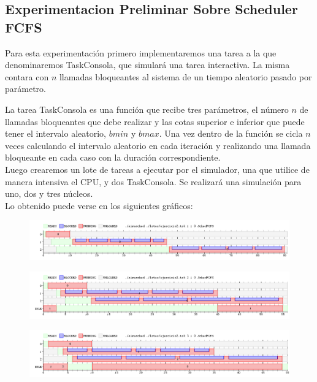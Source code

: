 \subsection{Experimentacion Preliminar Sobre Scheduler FCFS}

Para esta experimentación primero implementaremos una tarea a la que denominaremos TaskConsola, que simulará una tarea interactiva. La misma contara con $n$ llamadas bloqueantes al sistema de un tiempo aleatorio pasado por parámetro.

La tarea TaskConsola es una función que recibe tres parámetros, el número $n$ de llamadas bloqueantes que debe realizar y las cotas superior e inferior que puede tener el intervalo aleatorio, $bmin$ y $bmax$. Una vez dentro de la función se cicla $n$ veces calculando el intervalo aleatorio en cada iteración y realizando una llamada bloqueante en cada caso con la duración correspondiente.
\\
Luego crearemos un lote de tareas a ejecutar por el simulador, una que utilice de manera intensiva el CPU, y dos TaskConsola. Se realizará una simulación para uno, dos y tres núcleos.
\\
Lo obtenido puede verse en los siguientes gráficos:
\\
\begin{figure}[H]
  \centering
	\includegraphics[scale=0.45]{graficos/parte1/testFCFS1.png}
  \caption[Caption for LOF]{}
\end{figure}
\begin{figure}[H]
  \centering
	\includegraphics[scale=0.45]{graficos/parte1/testFCFS2.png}
  \caption[Caption for LOF]{}
\end{figure}
\begin{figure}[H]
  \centering
	\includegraphics[scale=0.45]{graficos/parte1/testFCFS3.png}
  \caption[Caption for LOF]{}
\end{figure}

